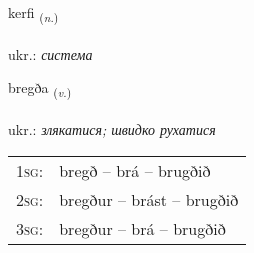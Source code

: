\documentclass[frontgrid, backgrid]{flacards}\usepackage[]{graphicx}\usepackage[]{xcolor}
\begin{document}
\renewcommand{\blhead}{\vskip5pt {\small\bfseries\footnotesize Nafnorð | іменник }}
\renewcommand{\bcfoot}{\vskip5pt \hspace{2pt}{\small\bfseries\footnotesize 1K}}


{kerfi \small{\textsubscript{(\textit{n.})}} \\[1ex] %
\textphonetic{[cʰɛrvɪ]} \\
ukr.: \emph{система} \\  [2ex]
\renewcommand*{\arraystretch}{0.8}
}

\renewcommand{\flhead}{\vskip5pt \fboxsep=0pt {\small\bfseries\footnotesize Sagnorð | дієслово}}
\renewcommand{\fcfoot}{\vskip5pt \fboxsep=0pt \hspace{2pt}{\small\bfseries\footnotesize 1K}}

\renewcommand{\blhead}{\vskip5pt {\small\bfseries\footnotesize Sagnorð | дієслово }}
\renewcommand{\bcfoot}{\vskip5pt \hspace{2pt}{\small\bfseries\footnotesize 1K}}


{bregða \small{\textsubscript{(\textit{v.})}} \\[1ex] %
\textphonetic{[prɛɣða]} \\
ukr.: \emph{злякатися; швидко рухатися} \\  [2ex]
\renewcommand*{\arraystretch}{0.8}
\begin{tabular}{p{1cm}l}
\textsc{1sg}: & bregð -- brá -- brugðið \\ 
\textsc{2sg}: & bregður -- brást -- brugðið \\ 
\textsc{3sg}: & bregður -- brá -- brugðið \\ 
\end{tabular}
}

\renewcommand{\flhead}{\vskip5pt \fboxsep=0pt {\small\bfseries\footnotesize Atviksorð | прислівник}}
\renewcommand{\fcfoot}{\vskip5pt \fboxsep=0pt \hspace{2pt}{\small\bfseries\footnotesize 1K}}
\end{document}

